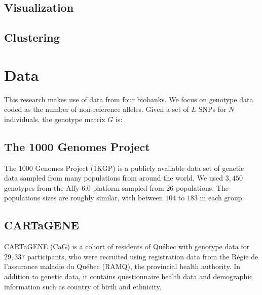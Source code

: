 \subsection{Visualization}



\subsection{Clustering}

\citep{mcinnes_accelerated_2017}

\section{Data}

This research makes use of data from four biobanks. We focus on genotype data coded as the number of non-reference alleles. Given a set of $L$ SNPs for $N$ individuals, the genotype matrix $G$ is:

%    

\subsection{The 1000 Genomes Project}

The 1000 Genomes Project (1KGP) is a publicly available data set of genetic data sampled from many populations from around the world\citep{global_2015}. We used $3,450$ genotypes from the Affy 6.0 platform sampled from $26$  populations. The populations sizes are roughly similar, with between $104$ to $183$ in each group.

\subsection{CARTaGENE}

CARTaGENE (CaG) is a cohort of residents of Qu\'{e}bec with genotype data for $29,337$ participants, who were recruited using registration data from the R\'{e}gie de l’assurance maladie du Qu\'{e}bec (RAMQ), the provincial health authority\citep{awadalla_cohort_2013}. In addition to genetic data, it contains questionnaire health data and demographic information such as country of birth and ethnicity.

